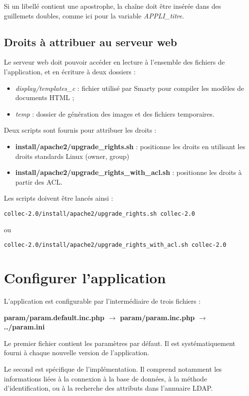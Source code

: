 Si un libellé contient une apostrophe, la chaîne doit être insérée dans des guillemets doubles, comme ici pour la variable \textit{APPLI\_titre}.


\subsection{Droits à attribuer au serveur web}
\label{droitsApache}
Le serveur web doit pouvoir accéder en lecture à l'ensemble des fichiers de l'application, et en écriture à deux dossiers :
\begin{itemize}
\item \textit{display/templates\_c} : fichier utilisé par Smarty pour compiler les modèles de documents HTML ;
\item \textit{temp} : dossier de génération des images et des fichiers temporaires.
\end{itemize}

Deux scripts sont fournis pour attribuer les droits : 
\begin{itemize}
\item \textbf{install/apache2/upgrade\_rights.sh} : positionne les droits en utilisant les droits standards Linux (owner, group)
\item \textbf{install/apache2/upgrade\_rights\_with\_acl.sh} : positionne les droits à partir des ACL.
\end{itemize}

Les scripts doivent être lancés ainsi :
\begin{lstlisting}
collec-2.0/install/apache2/upgrade_rights.sh collec-2.0
\end{lstlisting}
ou 
\begin{lstlisting}
collec-2.0/install/apache2/upgrade_rights_with_acl.sh collec-2.0
\end{lstlisting}


\section{Configurer l'application}

L'application est configurable par l'intermédiaire de trois fichiers :

\textbf{param/param.default.inc.php $\rightarrow$ param/param.inc.php $\rightarrow$ ../param.ini}

Le premier fichier contient les paramètres par défaut. Il est systématiquement fourni à chaque nouvelle version de l'application.

Le second est spécifique de l'implémentation. Il comprend notamment les informations liées à la connexion à la base de données, à la méthode d'identification, ou à la recherche des attributs dans l'annuaire LDAP. 

